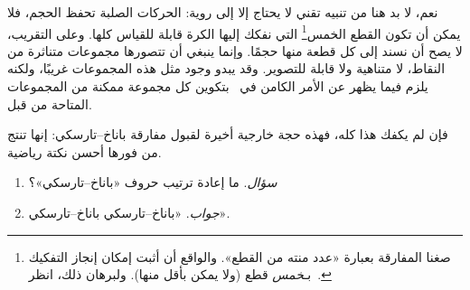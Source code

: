 \documentclass[../../../include/open-logic-section]{subfiles}
\begin{document}
نعم، لا بد هنا من تنبيه تقني لا يحتاج إلا إلى روية: الحركات الصلبة
تحفظ الحجم، فلا يمكن أن تكون القطع الخمس\footnote{صغنا المفارقة
بعبارة «عدد منته من القطع». والواقع أن
\citet{Robinson1947} أثبت إمكان إنجاز التفكيك بـ\emph{خمس} قطع (ولا
يمكن بأقل منها). ولبرهان ذلك، انظر~\citet[pp.~66--7]{Wagon2016}.}
التي نفكك إليها الكرة قابلة للقياس كلها. وعلى التقريب، لا يصح أن نسند
إلى كل قطعة منها حجمًا. وإنما ينبغي أن تتصورها مجموعات متناثرة من
النقاط، لا متناهية ولا قابلة للتصوير. وقد يبدو وجود مثل هذه المجموعات
غريبًا، ولكنه يلزم فيما يظهر عن الأمر الكامن في~\stagesacc{} بتكوين كل
مجموعة ممكنة من المجموعات المتاحة من قبل.

فإن لم يكفك هذا كله، فهذه حجة خارجية أخيرة لقبول مفارقة
باناخ--تارسكي: إنها تنتج من فورها أحسن نكتة رياضية.
\begin{enumerate}
	\item[] \emph{سؤال}. ما إعادة ترتيب حروف «باناخ--تارسكي»؟
	\item[] \emph{جواب}. «باناخ--تارسكي باناخ--تارسكي».
\end{enumerate}
\end{document}
